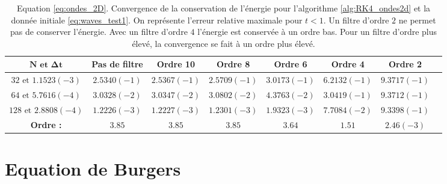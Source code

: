 \begin{table}[htbp]
\begin{center}
\begin{tabular}{|c||c|c|c|c|c|c|c|}
\hline
$\mathbf{N \text{ et } \Delta t}$ & \textbf{Pas de filtre} & \textbf{Ordre 10} & \textbf{Ordre 8} & \textbf{Ordre 6} & \textbf{Ordre 4} & \textbf{Ordre 2}\\
\hline
$32\text{ et }1.1523(-3)$ & $2.5340(-1)$ & $2.5367(-1)$ & $2.5709(-1)$ & $3.0173(-1)$ & $6.2132(-1)$ & $9.3717(-1)$ \\
\hline
$64\text{ et }5.7616(-4)$ & $3.0328(-2)$ & $3.0347(-2)$ & $3.0802(-2)$ & $4.3763(-2)$ & $3.0419(-1)$ & $9.3712(-1)$ \\
\hline
$128\text{ et }2.8808(-4)$& $1.2226(-3)$ & $1.2227(-3)$ & $1.2301(-3)$ & $1.9323(-3)$ & $7.7084(-2)$ & $9.3398(-1)$ \\
\hline
\hline
\textbf{Ordre :} & $3.85$ & $3.85$ & $3.85$ & $3.64$ & $1.51$ & $2.46(-3)$ \\
\hline 
\end{tabular}
\end{center}
\caption{Equation \eqref{eq:ondes_2D}. Convergence de la conservation de l'énergie pour l'algorithme \ref{alg:RK4_ondes2d} et la donnée initiale \eqref{eq:waves_test1}. On représente l'erreur relative maximale pour $t<1$. Un filtre d'ordre $2$ ne permet pas de conserver l'énergie. Avec un filtre d'ordre $4$ l'énergie est conservée à un ordre bas. Pour un filtre d'ordre plus élevé, la convergence se fait à un ordre plus élevé.}
\label{tab:conservation_waves}
\end{table} 






























\section{Equation de Burgers}

